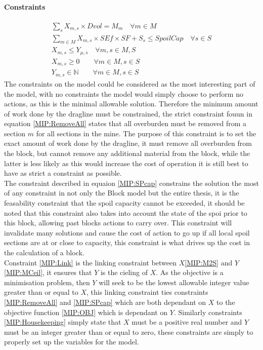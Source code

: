 \paragraph*{Constraints}
\begin{align}
\label{MIP:RemoveAll}
\sum_{s}X_{m,s}\times Dvol = M_{m}  \quad \forall m\in M  \\
\label{MIP:SPcap}
\sum_{m\in M} X_{m,s}\times SEf \times SF + S_s\leq SpoilCap \quad \forall s \in S \\ 
\label{MIP:Link}
X_{m,s} \leq Y_{\mu,s} \quad \forall m,s \in M,S\\
\label{MIP:Housekeeping}
X_{m,s} \geq 0 \qquad \forall m \in M , s \in S\\
Y_{m,s} \in \mathbb{N} \qquad \forall m \in M , s \in S
\end{align}
The constraints on the model could be considered as the most interesting part of the model, with no constraints the model would simply choose to perform no actions, as this is the minimal allowable solution. Therefore the minimum amount of work done by the dragline must be constrained, the strict constraint fouun in  equation \ref{MIP:RemoveAll} states that all overburden must be removed from a section $m$ for all sections in the mine. The purpose of this constraint is to set the exact amount of work done by the dragline, it must remove all overburden from the block, but cannot remove any additional material from the block, while the latter is less likely as this would increase the cost of operation it is still best to have as strict a constraint as possible. \\
The constraint described in equaion \ref{MIP:SPcap} constrains the solution the most of any constraint in not only the Block model but the entire thesis, it is the feasability constraint that the spoil capacity cannot be exceeded, it should be noted that this constraint also takes into account the state of the spoi prior to this block, allowing past blocks actions to carry over. This constraint will invalidate many solutions and cause the cost of action to go up if all local spoil sections are at or close to capacity, this constraint is what drives up the cost in the calculation of a block. 
\\ Constraint \ref{MIP:Link} is the linking constraint between $X$\ref{MIP:M2S} and $Y$\ref{MIP:MCeil}, it ensures that $Y$ is the cieling of $X$. As the objective is a minimisation problem, then $Y$ will seek to be the lowest allowable integer value greater than or equal to $X$, this linking constraint ties constraints \ref{MIP:RemoveAll} and \ref{MIP:SPcap} which are both dependant on $X$ to the objective function \ref{MIP:OBJ} which is dependant on $Y$. Similarly constraints \ref{MIP:Housekeeping} simply state that $X$ must be a positive real number and $Y$ must be an integer greater than or equal to zero, these constraints are simply to properly set up the variables for the model. 
